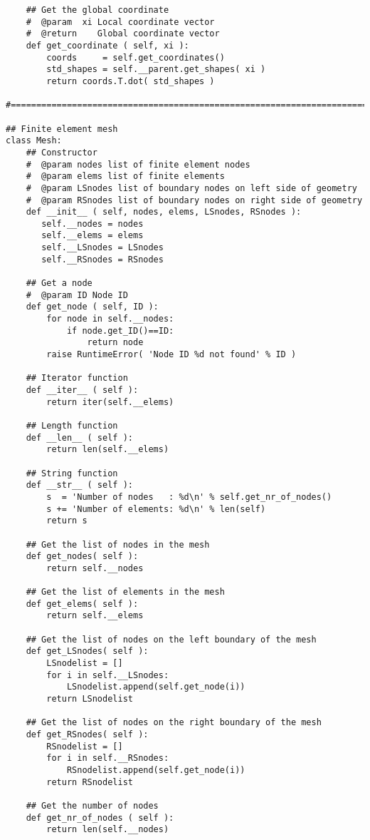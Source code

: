 \begin{appendices}
\begin{verbatim}
    ## Get the global coordinate
    #  @param  xi Local coordinate vector
    #  @return    Global coordinate vector
    def get_coordinate ( self, xi ):
        coords     = self.get_coordinates()
        std_shapes = self.__parent.get_shapes( xi )
        return coords.T.dot( std_shapes )
        
#==============================================================================
        
## Finite element mesh
class Mesh:
    ## Constructor
    #  @param nodes list of finite element nodes
    #  @param elems list of finite elements
    #  @param LSnodes list of boundary nodes on left side of geometry
    #  @param RSnodes list of boundary nodes on right side of geometry
    def __init__ ( self, nodes, elems, LSnodes, RSnodes ):
       self.__nodes = nodes
       self.__elems = elems
       self.__LSnodes = LSnodes
       self.__RSnodes = RSnodes
              
    ## Get a node
    #  @param ID Node ID
    def get_node ( self, ID ):
        for node in self.__nodes:
            if node.get_ID()==ID:
                return node
        raise RuntimeError( 'Node ID %d not found' % ID )
        
    ## Iterator function
    def __iter__ ( self ):
        return iter(self.__elems)

    ## Length function
    def __len__ ( self ):
        return len(self.__elems)

    ## String function
    def __str__ ( self ):
        s  = 'Number of nodes   : %d\n' % self.get_nr_of_nodes()
        s += 'Number of elements: %d\n' % len(self)
        return s
        
    ## Get the list of nodes in the mesh
    def get_nodes( self ):
        return self.__nodes
        
    ## Get the list of elements in the mesh
    def get_elems( self ):
        return self.__elems

    ## Get the list of nodes on the left boundary of the mesh
    def get_LSnodes( self ):
        LSnodelist = []
        for i in self.__LSnodes:
            LSnodelist.append(self.get_node(i))
        return LSnodelist
        
    ## Get the list of nodes on the right boundary of the mesh
    def get_RSnodes( self ):
        RSnodelist = []
        for i in self.__RSnodes:
            RSnodelist.append(self.get_node(i))
        return RSnodelist

    ## Get the number of nodes
    def get_nr_of_nodes ( self ):
        return len(self.__nodes)


\end{verbatim}
\end{appendices}
